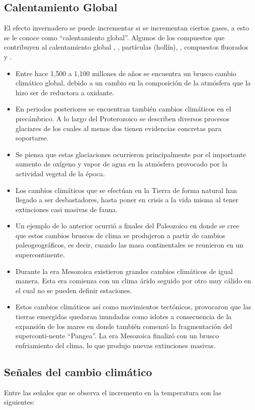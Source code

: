 \subsection{Calentamiento Global}
El efecto invernadero se puede incrementar si se incrementan ciertos gases, a esto se le conoce como ``calentamiento global''.
Algunos de los compuestos que contribuyen al calentamiento global  , , partículas (hollín), , compuestos fluorados y .
\begin{itemize}
\item  Entre hace 1,500 a 1,100 millones de años se encuentra un brusco cambio climático global, debido a un cambio en la composición de la atmósfera que la hizo ser de reductora a oxidante.
\item  En periodos posteriores se encuentran también cambios climáticos en el precámbrico. A lo largo del Proterozoico se describen diversos procesos glaciares de los cuales al menos dos tienen evidencias concretas para soportarse. 
\item  Se piensa que estas glaciaciones ocurrieron principalmente por el importante aumento de oxígeno y vapor de agua en la atmósfera provocado por la actividad vegetal de la época. 
\item  Los cambios climáticos que se efectúan en la Tierra de forma natural han llegado a ser desbastadores, hasta poner en crisis a la vida misma al tener extinciones casi masivas de fauna.
\item  Un ejemplo de lo anterior ocurrió a finales del Paleozoico en donde se cree que estos cambios bruscos de clima se produjeron a partir de cambios paleogeográficos, es decir, cuando las masa continentales se reunieron en un supercontinente.
\item  Durante la era Mesozoica existieron grandes cambios climáticos de igual manera. Esta era comienza con un clima árido seguido por otro muy cálido en el cual no se pueden definir estaciones. 
\item  Estos cambios climáticos así como movimientos tectónicos, provocaron que las tierras emergidas quedaran inundadas como islotes a consecuencia de la expansión de los mares en donde también comenzó la fragmentación del superconti-nente ``Pangea''. La era Mesozoica finalizó con un brusco enfriamiento del clima, lo que produjo nuevas extinciones masivas.
\end{itemize}

\subsection{Señales del cambio climático}
Entre las señales que se observa el incremento en la temperatura son las siguientes:

